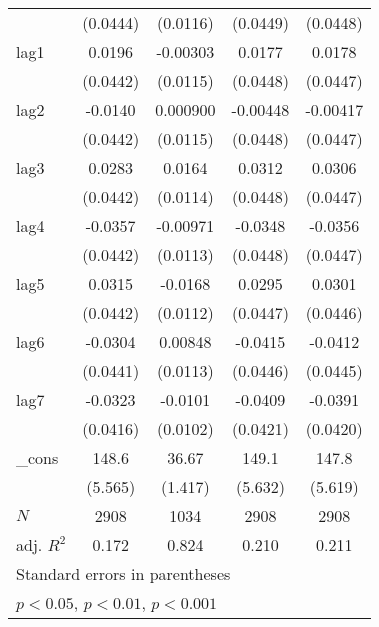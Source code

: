 {\begin{tabular}{l*{4}{c}}
            &    (0.0444)         &    (0.0116)         &    (0.0449)         &    (0.0448)         \\
[1em]
lag1        &      0.0196         &    -0.00303         &      0.0177         &      0.0178         \\
            &    (0.0442)         &    (0.0115)         &    (0.0448)         &    (0.0447)         \\
[1em]
lag2        &     -0.0140         &    0.000900         &    -0.00448         &    -0.00417         \\
            &    (0.0442)         &    (0.0115)         &    (0.0448)         &    (0.0447)         \\
[1em]
lag3        &      0.0283         &      0.0164         &      0.0312         &      0.0306         \\
            &    (0.0442)         &    (0.0114)         &    (0.0448)         &    (0.0447)         \\
[1em]
lag4        &     -0.0357         &    -0.00971         &     -0.0348         &     -0.0356         \\
            &    (0.0442)         &    (0.0113)         &    (0.0448)         &    (0.0447)         \\
[1em]
lag5        &      0.0315         &     -0.0168         &      0.0295         &      0.0301         \\
            &    (0.0442)         &    (0.0112)         &    (0.0447)         &    (0.0446)         \\
[1em]
lag6        &     -0.0304         &     0.00848         &     -0.0415         &     -0.0412         \\
            &    (0.0441)         &    (0.0113)         &    (0.0446)         &    (0.0445)         \\
[1em]
lag7        &     -0.0323         &     -0.0101         &     -0.0409         &     -0.0391         \\
            &    (0.0416)         &    (0.0102)         &    (0.0421)         &    (0.0420)         \\
[1em]
\_cons      &       148.6\sym{***}&       36.67\sym{***}&       149.1\sym{***}&       147.8\sym{***}\\
            &     (5.565)         &     (1.417)         &     (5.632)         &     (5.619)         \\
\hline
\(N\)       &        2908         &        1034         &        2908         &        2908         \\
adj. \(R^{2}\)&       0.172         &       0.824         &       0.210         &       0.211         \\
\hline\hline
\multicolumn{5}{l}{\footnotesize Standard errors in parentheses}\\
\multicolumn{5}{l}{\footnotesize \sym{*} \(p<0.05\), \sym{**} \(p<0.01\), \sym{***} \(p<0.001\)}\\
\end{tabular}
}
